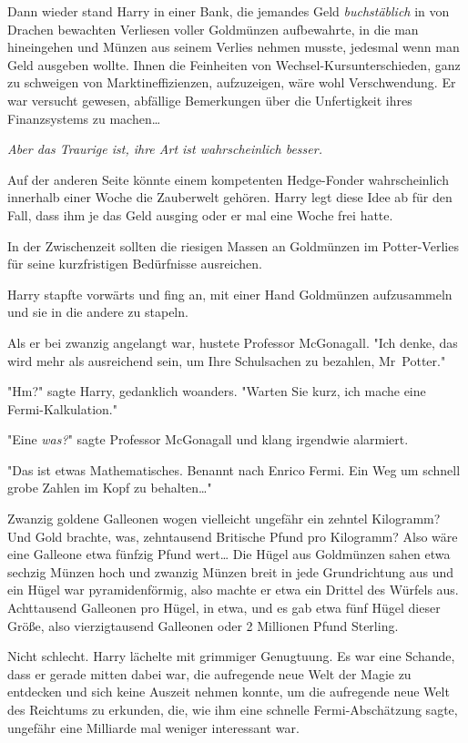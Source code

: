 {Dann wieder stand Harry in einer Bank, die jemandes Geld \emph{buchstäblich} in von Drachen bewachten Verliesen voller Goldmünzen aufbewahrte, in die man hineingehen und Münzen aus seinem Verlies nehmen musste, jedesmal wenn man Geld ausgeben wollte. Ihnen die Feinheiten von Wechsel-Kursunterschieden, ganz zu schweigen von Marktineffizienzen, aufzuzeigen, wäre wohl Verschwendung. Er war versucht gewesen, abfällige Bemerkungen über die Unfertigkeit ihres Finanzsystems zu machen…

\emph{Aber das Traurige ist, ihre Art ist wahrscheinlich besser.}

Auf der anderen Seite könnte einem kompetenten Hedge-Fonder wahrscheinlich innerhalb einer Woche die Zauberwelt gehören. Harry legt diese Idee ab für den Fall, dass ihm je das Geld ausging oder er mal eine Woche frei hatte.

In der Zwischenzeit sollten die riesigen Massen an Goldmünzen im Potter-Verlies für seine kurzfristigen Bedürfnisse ausreichen.

Harry stapfte vorwärts und fing an, mit einer Hand Goldmünzen aufzusammeln und sie in die andere zu stapeln.

Als er bei zwanzig angelangt war, hustete Professor McGonagall. "Ich denke, das wird mehr als ausreichend sein, um Ihre Schulsachen zu bezahlen, Mr~Potter."

"Hm?" sagte Harry, gedanklich woanders. "Warten Sie kurz, ich mache eine Fermi-Kalkulation."

"Eine \emph{was?}" sagte Professor McGonagall und klang irgendwie alarmiert.

"Das ist etwas Mathematisches. Benannt nach Enrico Fermi. Ein Weg um schnell grobe Zahlen im Kopf zu behalten…"

Zwanzig goldene Galleonen wogen vielleicht ungefähr ein zehntel Kilogramm? Und Gold brachte, was, zehntausend Britische Pfund pro Kilogramm? Also wäre eine Galleone etwa fünfzig Pfund wert… Die Hügel aus Goldmünzen sahen etwa sechzig Münzen hoch und zwanzig Münzen breit in jede Grundrichtung aus und ein Hügel war pyramidenförmig, also machte er etwa ein Drittel des Würfels aus. Achttausend Galleonen pro Hügel, in etwa, und es gab etwa fünf Hügel dieser Größe, also vierzigtausend Galleonen oder 2 Millionen Pfund Sterling.

Nicht schlecht. Harry lächelte mit grimmiger Genugtuung. Es war eine Schande, dass er gerade mitten dabei war, die aufregende neue Welt der Magie zu entdecken und sich keine Auszeit nehmen konnte, um die aufregende neue Welt des Reichtums zu erkunden, die, wie ihm eine schnelle Fermi-Abschätzung sagte, ungefähr eine Milliarde mal weniger interessant war.

}
